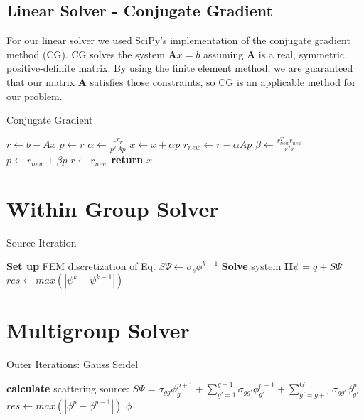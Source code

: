 \subsection{Linear Solver - Conjugate Gradient}
For our linear solver we used SciPy's implementation of the conjugate gradient method (CG). CG solves the system $\textbf{A}x = b$ assuming $\textbf{A}$ is a real, symmetric, positive-definite matrix. By using the finite element method, we are guaranteed that our matrix $\textbf{A}$ satisfies those constraints, so CG is an applicable method for our problem.  
\begin{algorithm}
\caption{Conjugate Gradient}
\begin{algorithmic}
    \State $r \gets b - Ax$
    \State $p \gets r$
        \State $\alpha \gets \frac{r^Tr}{p^TAp}$
        \State $x \gets x + \alpha p$
        \State $r_{new} \gets r - \alpha A p$
        \State $\beta \gets \frac{r_{new}^Tr_{new}}{r^Tr}$
        \State $p \gets r_{new} + \beta p$
        \State $r \gets r_{new}$
    \EndWhile
    \State \textbf{return} $x$  
\end{algorithmic}
\end{algorithm}

\section{Within Group Solver}
\begin{algorithm}
\caption{Source Iteration}
\begin{algorithmic}
 
    \State \textbf{Set up} FEM discretization of Eq.
    \State $S\Psi \gets \sigma_s \phi^{k-1}$ 
    \State \textbf{Solve} system $\textbf{H}\psi=q + S\Psi$
    \State $res \gets max(|\psi^{k} - \psi^{k-1}|)$
\EndWhile
\end{algorithmic}
\end{algorithm}

\section{Multigroup Solver}
\begin{algorithm}
\caption{Outer Iterations: Gauss Seidel}
\begin{algorithmic}
     
            \State \textbf{calculate} scattering source: \State $S\Psi = \sigma_{gg}\phi_g^{p+1} + \sum\limits_{g'=1}^{g-1} \sigma_{gg'} \phi_{g'}^{p+1} + \sum\limits_{g'=g+1}^G \sigma_{gg'}\phi_{g'}^p$
        \EndProcedure
        \EndFor
        \State $res \gets max(|\phi^{p} - \phi^{p-1}|)$  
        \EndWhile
    \Return $\phi$
\end{algorithmic}
\end{algorithm}

